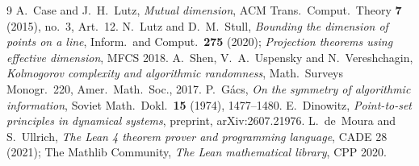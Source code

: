 \documentclass[11pt]{amsart}
\theoremstyle{definition}
\begin{document}
\begin{thebibliography}{9}
 A.~Case and J.~H.~Lutz, \emph{Mutual dimension}, ACM Trans.\ Comput.\ Theory \textbf{7} (2015), no.~3, Art.~12.
 N.~Lutz and D.~M.~Stull, \emph{Bounding the dimension of points on a line}, Inform.\ and Comput.\ \textbf{275} (2020); \emph{Projection theorems using effective dimension}, MFCS 2018.
 A.~Shen, V.~A.~Uspensky and N.~Vereshchagin, \emph{Kolmogorov complexity and algorithmic randomness}, Math.\ Surveys Monogr.\ 220, Amer.\ Math.\ Soc., 2017.
 P.~G\'acs, \emph{On the symmetry of algorithmic information}, Soviet Math.\ Dokl.\ \textbf{15} (1974), 1477--1480.
 E.~Dinowitz, \emph{Point-to-set principles in dynamical systems}, preprint, arXiv:2607.21976.
 L.~de~Moura and S.~Ullrich, \emph{The Lean 4 theorem prover and programming language}, CADE 28 (2021); The Mathlib Community, \emph{The Lean mathematical library}, CPP 2020.
\end{thebibliography}
\end{document}
